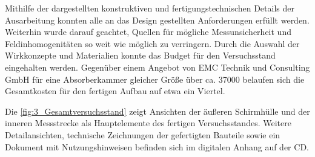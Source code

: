 Mithilfe der dargestellten konstruktiven und fertigungstechnischen Details der Ausarbeitung konnten alle an das Design gestellten Anforderungen erfüllt werden. Weiterhin wurde darauf geachtet, Quellen für mögliche Messunsicherheit und Feldinhomogenitäten so weit wie möglich zu verringern. Durch die Auswahl der Wirkkonzepte und Materialien konnte das Budget für den Versuchsstand eingehalten werden. Gegenüber einem Angebot von EMC Technik und Consulting GmbH für eine Absorberkammer gleicher Größe über ca. \SI{37000}{\text{\euro}} belaufen sich die Gesamtkosten für den fertigen Aufbau auf etwa ein Viertel. 
\par
\vspace{\linespace}
Die \Abb\ref{fig:3_Gesamtversuchsstand} zeigt Ansichten der äußeren Schirmhülle und der inneren Messstrecke als Haupt\-elemente des fertigen Versuchsstandes. Weitere Detailansichten, technische Zeichnungen der gefertigten Bauteile sowie ein Dokument mit Nutzungshinweisen befinden sich im digitalen Anhang auf der CD.
\par
\vspace{\linespace}

